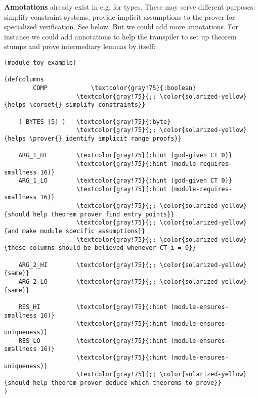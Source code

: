 \textbf{Annotations} already exist in \corset{} e.g. for types. These may serve different purposes: simplify constraint systems, provide implicit assumptions to the prover for specialized verification. See below. But we could add more annotations. For instance we could add annotations to help the transpiler to set up theorem stumps and prove intermediary lemmas by itself:
\begin{Verbatim}[commandchars=\\\{\}]
(module toy-example)

(defcolumns
        COMP            \textcolor{gray!75}{:boolean}
	                \textcolor{gray!75}{;; \color{solarized-yellow}{helps \corset{} simplify constraints}}
			
	( BYTES [5] )   \textcolor{gray!75}{:byte}
	                \textcolor{gray!75}{;; \color{solarized-yellow}{helps \prover{} identify implicit range proofs}}

	ARG_1_HI        \textcolor{gray!75}{:hint (god-given CT 0)}
	                \textcolor{gray!75}{:hint (module-requires-smallness 16)}
	ARG_1_LO        \textcolor{gray!75}{:hint (god-given CT 0)}
	                \textcolor{gray!75}{:hint (module-requires-smallness 16)}
	                \textcolor{gray!75}{;; \color{solarized-yellow}{should help theorem prover find entry points}}
	                \textcolor{gray!75}{;; \color{solarized-yellow}{and make module specific assumptions}}
	                \textcolor{gray!75}{;; \color{solarized-yellow}{these columns should be believed whenever CT_i = 0}}

	ARG_2_HI        \textcolor{gray!75}{;; \color{solarized-yellow}{same}}
	ARG_2_LO        \textcolor{gray!75}{;; \color{solarized-yellow}{same}}

	RES_HI          \textcolor{gray!75}{:hint (module-ensures-smallness 16)}
	                \textcolor{gray!75}{:hint (module-ensures-uniqueness)}
	RES_LO          \textcolor{gray!75}{:hint (module-ensures-smallness 16)}
	                \textcolor{gray!75}{:hint (module-ensures-uniqueness)}
	                \textcolor{gray!75}{;; \color{solarized-yellow}{should help theorem prover deduce which theorems to prove}}
)
\end{Verbatim}
